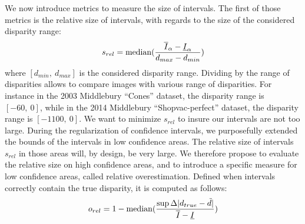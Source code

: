 We now introduce metrics to measure the size of intervals. The first of those metrics is the relative size of intervals, with regards to the size of the considered disparity range:
\begin{align}\label{eq:relative_size_disparity}
    s_{rel}=\operatorname*{median}(\dfrac{\overline{I}_\alpha-\underline{I}_\alpha}{d_{max}-d_{min}})
\end{align}
where $[d_{min}, ~d_{max}]$ is the considered disparity range. Dividing by the range of disparities allows to compare images with various range of disparities. For instance in the 2003 Middlebury ``Cones'' dataset, the disparity range is $[-60, ~0]$, while in the 2014 Middlebury ``Shopvac-perfect'' dataset, the disparity range is $[-1100, ~0]$. We want to minimize $s_{rel}$ to insure our intervals are not too large. During the regularization of confidence intervals, we purposefully extended the bounds of the intervals in low confidence areas. The relative size of intervals $s_{rel}$ in those areas will, by design, be very large. We therefore propose to evaluate the relative size on high confidence areas, and to introduce a specific measure for low confidence areas, called relative overestimation. Defined when intervals correctly contain the true disparity, it is computed as follows:
\begin{align}
    o_{rel}=1-\operatorname*{median}(\dfrac{\sup\Delta|d_{true}-\tilde{d}|}{\overline{I}-\underline{I}})\label{eq:relative_overestimation_disparity}
\end{align}
